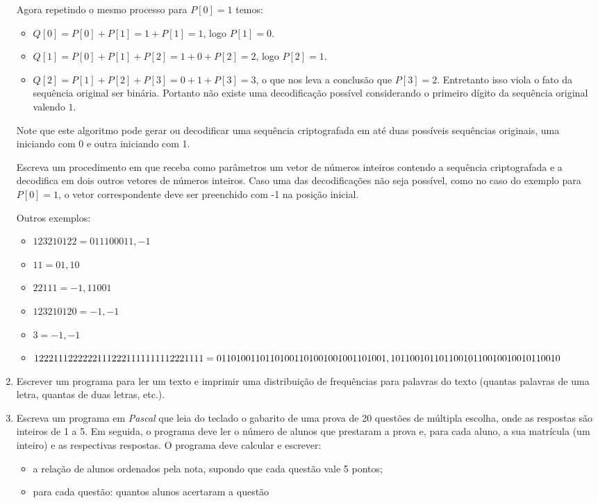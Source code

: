 \begin{enumerate}
Agora repetindo o mesmo processo para $P[0] = 1$ temos:
\begin{itemize}
\item
$Q[0] = P[0] + P[1] = 1 + P[1] = 1$, logo $P[1] = 0$.
\item
$Q[1] = P[0] + P[1] + P[2] = 1 + 0 + P[2] = 2$, logo $P[2] = 1$.
\item
$Q[2] = P[1] + P[2] + P[3] = 0 + 1 + P[3] = 3$, o que nos leva a conclusão que $P[3] = 2$.
Entretanto isso viola o fato da sequência original ser binária. Portanto não
existe uma decodificação possível considerando o primeiro dígito da sequência original
valendo $1$.
\end{itemize}
Note que este algoritmo pode gerar ou decodificar uma sequência criptografada em até duas 
possíveis sequências originais, uma iniciando com 0 e outra iniciando com 1.

Escreva um procedimento em  que receba como parâmetros um vetor de
números inteiros contendo a sequência criptografada e a decodifica em dois outros
vetores de números inteiros. Caso uma das decodificações não seja possível, como
no caso do exemplo para $P[0] = 1$, o vetor correspondente deve ser preenchido com -1
na posição inicial.

Outros exemplos:
\begin{itemize}
\item
$123210122 = 011100011, -1$
\item
$11 = 01, 10$
\item
$22111 = -1, 11001$
\item
$123210120 = -1, -1$
\item
$3 = -1, -1$
\item
$12221112222221112221111111112221111 = \\
01101001101101001101001001001101001, \\
10110010110110010110010010010110010$
\end{itemize}

\item Escrever um programa para ler um texto e imprimir uma distribuição de
   frequências para  palavras do texto  (quantas palavras de  uma letra,
   quantas de duas letras, etc.).


\item Escreva um programa em \emph{Pascal} que leia do teclado o gabarito de uma prova
de 20 questões de múltipla escolha, onde as respostas são inteiros de 1 a
5.  Em seguida, o programa deve ler o número de alunos que prestaram a prova
e, para cada aluno, a sua matrícula (um inteiro) e as respectivas respostas.
O programa deve calcular e escrever:
\begin{itemize}
\item a relação de alunos ordenados pela nota, supondo que cada questão vale 5 pontos;
\item para cada questão: quantos alunos acertaram a questão
\end{itemize}




\end{enumerate}
